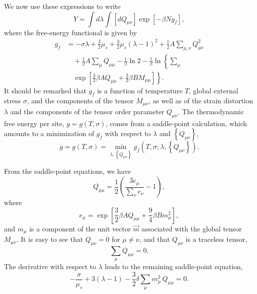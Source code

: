 \documentclass[aps,pre,reprint,amsmath,amssymbols,superscriptaddress,
nofootinbib]{revtex4-1}
\begin{document}
We now use these expressions to write%
\begin{equation}
Y=\int d\lambda\int\left[  dQ_{\mu\nu}\right]  \exp\left[  -\beta
Ng_{f}\right]  ,
\end{equation}
where the free-energy functional is given by%
\begin{align}
g_{f}&=-\sigma\lambda+\frac{3}{2}\mu_{s}+\frac{3}{2}\mu_{s}\left(
\lambda-1\right)  ^{2}+\frac{1}{2}A\sum_{\mu,\nu}Q_{\mu\nu}^{2}
\nonumber \\ & \quad
+\frac{1}{2}A\sum_{\mu}Q_{\mu\mu}
-\frac{1}{\beta}\ln2-\frac{1}{\beta}\ln\left\{  \sum_{\mu}
\right. \nonumber \\ & \quad \left.
\exp\left[ \frac{3}{2}\beta AQ_{\mu\mu}
+\frac{3}{2}\beta BM_{\mu\mu}\right]  \right\}
.\label{gf}%
\end{align}
It should be remarked that $g_{f}$ is a function of temperature $T$, global
external stress $\sigma$, and the components of the tensor $M_{\mu\nu}$, as
well as of the strain distortion $\lambda$ and the components of the tensor
order parameter $Q_{\mu\nu}$. The thermodynamic free energy per site,
$g=g\left(  T,\sigma \right)  $, comes from a
saddle-point calculation, which amounts to a minimization of $g_{f}$ with
respect to $\lambda$ and $\left\{  Q_{\mu\nu}\right\}  $,%
\begin{equation}
g=g\left(  T,\sigma \right)  =\min
\limits_{\lambda,\left\{  Q_{\mu\nu}\right\}  }g_{f}\left(  T,\sigma ;\lambda,\left\{  Q_{\mu\nu}\right\}  \right)  .
\end{equation}


From the saddle-point equations, we have%
\begin{equation}
Q_{\mu\mu}=\frac{1}{2}\left(  \frac{3e_{\mu}}{\sum_{\nu}e_{\nu}}-1\right)
,\label{qmumu}%
\end{equation}
where%
\begin{equation}
e_{\mu}=\exp\left[  \frac{3}{2}\beta AQ_{\mu\mu}+\frac{9}{4}\beta Bm_{\mu}%
^{2}\right]  ,\label{emu}%
\end{equation}
and $m_{\mu}$ is a component of the unit vector $\overrightarrow{m}$
associated with the global tensor $M_{\mu\nu}$. It is easy to see that
$Q_{\mu\nu}=0$ for $\mu\neq\nu$, and that $Q_{\mu\nu}$ is a traceless tensor,%
\begin{equation}
\sum_{\mu}Q_{\mu\mu}=0.
\end{equation}
The derivative with respect to $\lambda$ leads to the remaining saddle-point
equation,%
\begin{equation}
-\frac{\sigma}{\mu_{s}}+3\left(  \lambda-1\right)  -\frac{3}{2}\delta\sum
_{\mu}m_{\mu}^{2}\,Q_{\mu\mu}=0.\label{sigma}%
\end{equation}
\end{document}
